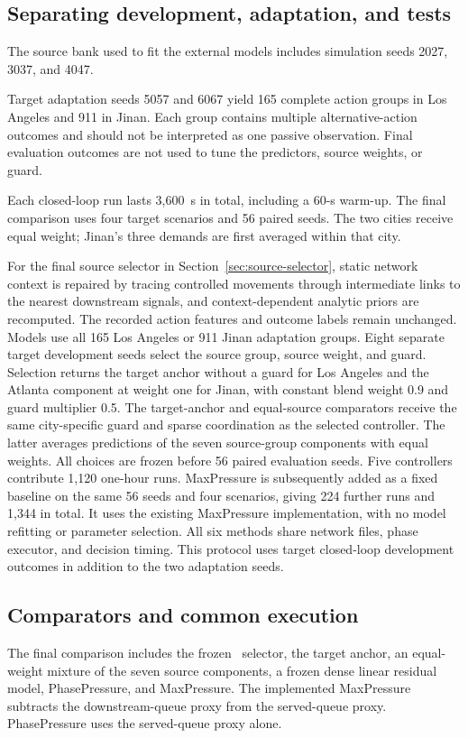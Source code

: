 \subsection{Separating development, adaptation, and tests}
The source bank used to fit the external models includes simulation seeds 2027, 3037, and 4047.

Target adaptation seeds 5057 and 6067 yield 165 complete action groups in Los Angeles and 911 in Jinan. Each group contains multiple alternative-action outcomes and should not be interpreted as one passive observation. Final evaluation outcomes are not used to tune the predictors, source weights, or guard.

Each closed-loop run lasts 3,600~s in total, including a 60-s warm-up. The final comparison uses four target scenarios and 56 paired seeds. The two cities receive equal weight; Jinan's three demands are first averaged within that city.

For the final source selector in Section~\ref{sec:source-selector}, static network context is repaired by tracing controlled movements through intermediate links to the nearest downstream signals, and context-dependent analytic priors are recomputed. The recorded action features and outcome labels remain unchanged. Models use all 165 Los Angeles or 911 Jinan adaptation groups. Eight separate target development seeds select the source group, source weight, and guard. Selection returns the target anchor without a guard for Los Angeles and the Atlanta component at weight one for Jinan, with constant blend weight 0.9 and guard multiplier 0.5. The target-anchor and equal-source comparators receive the same city-specific guard and sparse coordination as the selected controller. The latter averages predictions of the seven source-group components with equal weights. All choices are frozen before 56 paired evaluation seeds. Five controllers contribute 1,120 one-hour runs. MaxPressure is subsequently added as a fixed baseline on the same 56 seeds and four scenarios, giving 224 further runs and 1,344 in total. It uses the existing MaxPressure implementation, with no model refitting or parameter selection. All six methods share network files, phase executor, and decision timing. This protocol uses target closed-loop development outcomes in addition to the two adaptation seeds.

\subsection{Comparators and common execution}
The final comparison includes the frozen \method\ selector, the target anchor, an equal-weight mixture of the seven source components, a frozen dense linear residual model, PhasePressure, and MaxPressure. The implemented MaxPressure subtracts the downstream-queue proxy from the served-queue proxy. PhasePressure uses the served-queue proxy alone.

